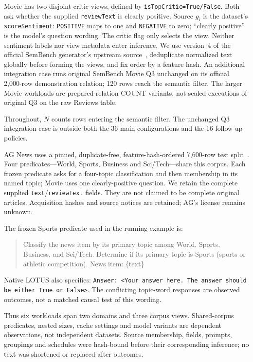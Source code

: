 Movie has two disjoint critic views, defined by \texttt{isTopCritic=True/False}. Both ask whether the supplied \texttt{reviewText} is clearly positive. Source $g_i$ is the dataset's \texttt{scoreSentiment}: \texttt{POSITIVE} maps to one and \texttt{NEGATIVE} to zero; ``clearly positive'' is the model's question wording. The critic flag only selects the view. Neither sentiment labels nor view metadata enter inference. We use version~4 of the official SemBench generator's upstream source~\cite{sembench,movie_data}, deduplicate normalized text globally before forming the views, and fix order by a feature hash. An additional integration case runs original SemBench Movie Q3 unchanged on its official 2,000-row demonstration relation; 120 rows reach the semantic filter. The larger Movie workloads are prepared-relation COUNT variants, not scaled executions of original Q3 on the raw Reviews table.

Throughout, $N$ counts rows entering the semantic filter. The unchanged Q3 integration case is outside both the 36 main configurations and the 16 follow-up policies.

AG News uses a pinned, duplicate-free, feature-hash-ordered 7,600-row test split~\cite{agnews}. Four predicates---World, Sports, Business and Sci/Tech---share this corpus. Each frozen predicate asks for a four-topic classification and then membership in its named topic; Movie uses one clearly-positive question. We retain the complete supplied \texttt{text}/\texttt{reviewText} fields. They are not claimed to be complete original articles. Acquisition hashes and source notices are retained; AG's license remains unknown.

The frozen Sports predicate used in the running example is:
\begin{quote}\small
Classify the news item by its primary topic among World, Sports, Business, and Sci/Tech. Determine if its primary topic is Sports (sports or athletic competition). News item: \{text\}
\end{quote}
Native LOTUS also specifies: \texttt{Answer: <Your answer here. The answer should be either True or False>}. The conflicting topic-word responses are observed outcomes, not a matched causal test of this wording.

Thus six workloads span two domains and three corpus views. Shared-corpus predicates, nested sizes, cache settings and model variants are dependent observations, not independent datasets. Source membership, fields, prompts, groupings and schedules were hash-bound before their corresponding inference; no text was shortened or replaced after outcomes.

